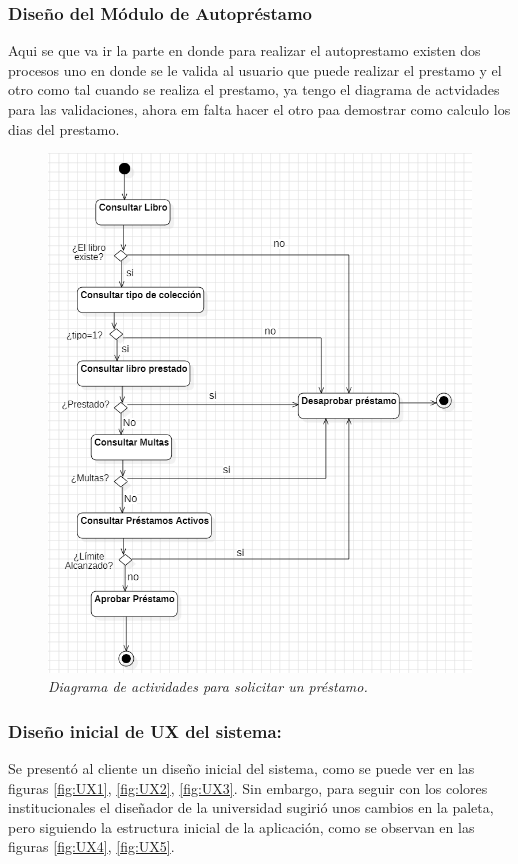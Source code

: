 \documentclass[spanish]{ieee_upb}
\begin{document}
\subsubsection{Diseño del Módulo de Autopréstamo}
Aqui se que va ir la parte en donde para realizar el autoprestamo existen dos procesos uno en donde se le valida al usuario que puede realizar el prestamo y el otro como tal cuando se realiza el prestamo, ya tengo el diagrama de actvidades para las validaciones, ahora em falta hacer el otro paa demostrar como calculo los dias del prestamo.
 \begin{figure}[H] 
	\centering
	\includegraphics[width=0.8\linewidth]{img/diagramaActividadesSolicitud.png}
	\vspace{-1mm}
	\caption[Diagrama de Actividades para solicitar un préstamo]{\textit{Diagrama de actividades para solicitar un préstamo.}}
	\label{fig:actividadesSolPrestamo} 
\end{figure}


\subsubsection{Diseño inicial de UX del sistema:}
 Se presentó al cliente un diseño inicial del sistema, como se puede ver en las figuras \ref{fig:UX1}, \ref{fig:UX2}, \ref{fig:UX3}. Sin embargo, para seguir con los colores institucionales el diseñador de la universidad sugirió unos cambios en la paleta, pero siguiendo la estructura inicial de la aplicación, como se observan en las figuras \ref{fig:UX4}, \ref{fig:UX5}.
\end{document}
